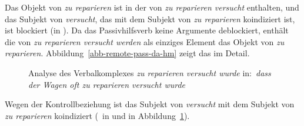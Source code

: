 {\noindent
Das Objekt von \emph{zu reparieren} ist in der \compsl von \emph{zu reparieren versucht} enthalten,
und das Subjekt von \emph{versucht}, das mit dem Subjekt von \emph{zu reparieren} koindiziert ist,
ist blockiert (in \da).
Da das Passivhilfsverb keine Argumente deblockiert, enthält die \compsl von \emph{zu reparieren versucht werden}
als einziges Element das Objekt von \emph{zu reparieren}.
Abbildung~\vref{abb-remote-pass-da-hm} zeigt das im Detail.
\begin{figure}
\caption{Analyse des Verbalkomplexes \emph{zu reparieren versucht wurde} in:\ \emph{dass der Wagen oft zu reparieren versucht wurde}}\label{abb-remote-pass-da-hm}
\end{figure}
Wegen der Kontrollbeziehung ist das Subjekt von \emph{versucht} mit dem Subjekt von \emph{zu reparieren} koindiziert (\,
in  und  in Abbildung~\ref{abb-remote-pass-da-hm}).
}
